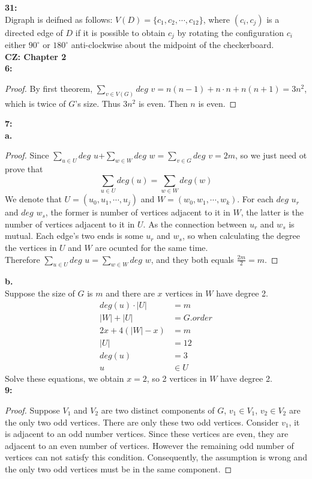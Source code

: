\documentclass[11pt]{article}
\begin{document}
\textbf{31:}\\
Digraph is deifned as follows: $V(D)=\{c_1,c_2,\cdots,c_12\}$, where $(c_i,c_j)$ is a directed edge of $D$ if it is possible to obtain $c_j$ by rotating the configuration $c_i$ either $90^{\circ}$ or $180^{\circ}$ anti-clockwise about the midpoint of the checkerboard.\\
\large\textbf{CZ: Chapter 2}\\
\normalsize\textbf{6:}
\begin{proof}
By first theorem, $\sum_{v\in V(G)}deg$ $v=n(n-1)+n\cdot n+n(n+1)=3n^2$, which is twice of $G$'s size. Thus $3n^2$ is even. Then $n$ is even.
\end{proof}
\textbf{7:}\\
\textbf{a.}
\begin{proof}
Since $\sum_{u\in U}deg$ $u$+$\sum_{w\in W}deg$ $w=\sum_{v\in G}deg$ $v=2m$, so we just need ot prove that \[\sum_{u\in U}deg (u)=\sum_{w\in W}deg(w)\]We denote that $U=(u_0,u_1,\cdots,u_j)$ and $W=(w_0,w_1,\cdots,w_k)$. For each $deg$ $u_r$ and $deg$ $w_s$, the former is number of vertices adjacent to it in $W$, the latter is the number of vertices adjacent to it in $U$. As the connection between $u_r$ and $w_s$ is mutual. Each edge's two ends is some $u_r$ and $w_s$, so when calculating the degree the vertices in $U$ and $W$ are ocunted for the same time.\\
Therefore $\sum_{u\in U}deg$ $u=\sum_{w\in W}deg$ $w$, and they both equals $\frac{2m}{2}=m$.
\end{proof}
\textbf{b.}\\
Suppose the size of $G$ is $m$ and there are $x$ vertices in $W$ have degree 2.
\begin{equation*}
\begin{aligned}
deg(u)\cdot|U|&=m\\
|W|+|U|&=G.order\\
2x+4(|W|-x)&=m\\
|U|&=12\\
deg(u)&=3\\
u&\in U
\end{aligned}
\end{equation*}
Solve these equations, we obtain $x=2$, so 2 vertices in $W$ have degree 2.\\
\textbf{9:}
\begin{proof}
Suppose $V_1$ and $V_2$ are two distinct components of $G$, $v_1\in V_1$, $v_2\in V_2$ are the only two odd vertices. There are only these two odd vertices. Consider $v_1$, it is adjacent to an odd number vertices. Since these vertices are even, they are adjacent to an even number of vertices. However the remaining odd number of vertices can not satisfy this condition. Consequently, the assumption is wrong and the only two odd vertices must be in the same component.
\end{proof}
\end{document}
